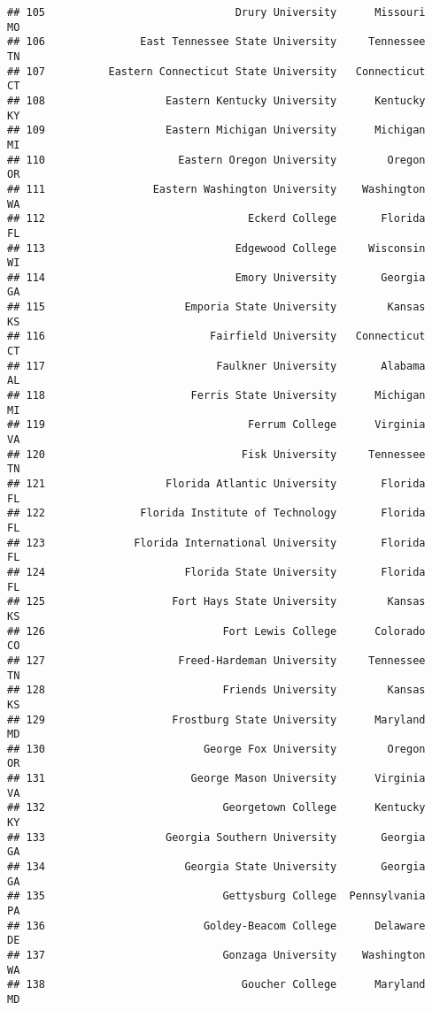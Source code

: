 \documentclass[
]{article}
\begin{document}
\begin{verbatim}
## 105                              Drury University      Missouri         MO
## 106               East Tennessee State University     Tennessee         TN
## 107          Eastern Connecticut State University   Connecticut         CT
## 108                   Eastern Kentucky University      Kentucky         KY
## 109                   Eastern Michigan University      Michigan         MI
## 110                     Eastern Oregon University        Oregon         OR
## 111                 Eastern Washington University    Washington         WA
## 112                                Eckerd College       Florida         FL
## 113                              Edgewood College     Wisconsin         WI
## 114                              Emory University       Georgia         GA
## 115                      Emporia State University        Kansas         KS
## 116                          Fairfield University   Connecticut         CT
## 117                           Faulkner University       Alabama         AL
## 118                       Ferris State University      Michigan         MI
## 119                                Ferrum College      Virginia         VA
## 120                               Fisk University     Tennessee         TN
## 121                   Florida Atlantic University       Florida         FL
## 122               Florida Institute of Technology       Florida         FL
## 123              Florida International University       Florida         FL
## 124                      Florida State University       Florida         FL
## 125                    Fort Hays State University        Kansas         KS
## 126                            Fort Lewis College      Colorado         CO
## 127                     Freed-Hardeman University     Tennessee         TN
## 128                            Friends University        Kansas         KS
## 129                    Frostburg State University      Maryland         MD
## 130                         George Fox University        Oregon         OR
## 131                       George Mason University      Virginia         VA
## 132                            Georgetown College      Kentucky         KY
## 133                   Georgia Southern University       Georgia         GA
## 134                      Georgia State University       Georgia         GA
## 135                            Gettysburg College  Pennsylvania         PA
## 136                         Goldey-Beacom College      Delaware         DE
## 137                            Gonzaga University    Washington         WA
## 138                               Goucher College      Maryland         MD

\end{verbatim}
\end{document}
